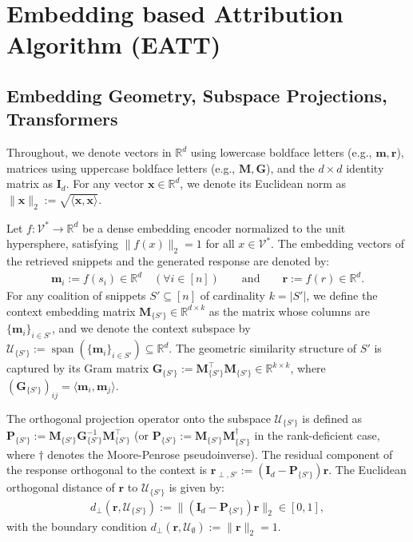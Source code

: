\documentclass{article}
\begin{document}
\section{Embedding based Attribution Algorithm (EATT)}

\subsection{Embedding Geometry, Subspace Projections, Transformers} 


Throughout, we denote vectors in $\mathbb{R}^d$ using lowercase boldface letters (e.g., $\mathbf{m}, \mathbf{r}$), matrices using uppercase boldface letters (e.g., $\mathbf{M}, \mathbf{G}$), and the $d \times d$ identity matrix as $\mathbf{I}_d$. For any vector $\mathbf{x} \in \mathbb{R}^d$, we denote its Euclidean norm as $\|\mathbf{x}\|_2 := \sqrt{\langle \mathbf{x}, \mathbf{x} \rangle}$.

Let $f: \mathcal{V}^* \to \mathbb{R}^d$ be a dense embedding encoder normalized to the unit hypersphere, satisfying $\|f(x)\|_2 = 1$ for all $x \in \mathcal{V}^*$. The embedding vectors of the retrieved snippets and the generated response are denoted by:
\begin{align}
    \mathbf{m}_i := f(s_i) \in \mathbb{R}^d \quad (\forall i \in [n]) \qquad \text{and} \qquad \mathbf{r} := f(r) \in \mathbb{R}^d.
\end{align}
For any coalition of snippets $S' \subseteq [n]$ of cardinality $k = |S'|$, we define the context embedding matrix $\mathbf{M}_{\{S'\}} \in \mathbb{R}^{d \times k}$ as the matrix whose columns are $\{\mathbf{m}_i\}_{i \in S'}$, and we denote the context subspace by $\mathcal{U}_{\{S'\}} := \operatorname{span}(\{\mathbf{m}_i\}_{i \in S'}) \subseteq \mathbb{R}^d$. The geometric similarity structure of $S'$ is captured by its Gram matrix $\mathbf{G}_{\{S'\}} := \mathbf{M}_{\{S'\}}^\top \mathbf{M}_{\{S'\}} \in \mathbb{R}^{k \times k}$, where $(\mathbf{G}_{\{S'\}})_{ij} = \langle \mathbf{m}_i, \mathbf{m}_j \rangle$. 

The orthogonal projection operator onto the subspace $\mathcal{U}_{\{S'\}}$ is defined as $\mathbf{P}_{\{S'\}} := \mathbf{M}_{\{S'\}} \mathbf{G}_{\{S'\}}^{-1} \mathbf{M}_{\{S'\}}^\top$ (or $\mathbf{P}_{\{S'\}} := \mathbf{M}_{\{S'\}} \mathbf{M}_{\{S'\}}^\dagger$ in the rank-deficient case, where $\dagger$ denotes the Moore-Penrose pseudoinverse). The residual component of the response orthogonal to the context is $\mathbf{r}_{\perp, S'} := (\mathbf{I}_d - \mathbf{P}_{\{S'\}})\mathbf{r}$. The Euclidean orthogonal distance of $\mathbf{r}$ to $\mathcal{U}_{\{S'\}}$ is given by:
\begin{align}
    d_{\perp}(\mathbf{r}, \mathcal{U}_{\{S'\}}) := \|(\mathbf{I}_d - \mathbf{P}_{\{S'\}})\mathbf{r}\|_2 \in [0, 1],
\end{align}
with the boundary condition $d_{\perp}(\mathbf{r}, \mathcal{U}_{\emptyset}) := \|\mathbf{r}\|_2 = 1$.
\end{document}
